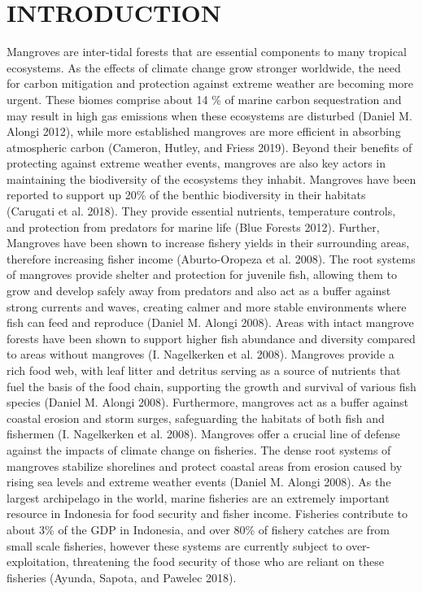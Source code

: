 \documentclass[
]{article}
\begin{document}
\section{INTRODUCTION}\label{introduction}

Mangroves are inter-tidal forests that are essential components to many tropical ecosystems. As the effects of climate change grow stronger worldwide, the need for carbon mitigation and protection against extreme weather are becoming more urgent. These biomes comprise about 14 \% of marine carbon sequestration and may result in high gas emissions when these ecosystems are disturbed (Daniel M. Alongi 2012), while more established mangroves are more efficient in absorbing atmospheric carbon (Cameron, Hutley, and Friess 2019). Beyond their benefits of protecting against extreme weather events, mangroves are also key actors in maintaining the biodiversity of the ecosystems they inhabit. Mangroves have been reported to support up 20\% of the benthic biodiversity in their habitats (Carugati et al. 2018). They provide essential nutrients, temperature controls, and protection from predators for marine life (Blue Forests 2012). Further, Mangroves have been shown to increase fishery yields in their surrounding areas, therefore increasing fisher income (Aburto-Oropeza et al. 2008). The root systems of mangroves provide shelter and protection for juvenile fish, allowing them to grow and develop safely away from predators and also act as a buffer against strong currents and waves, creating calmer and more stable environments where fish can feed and reproduce (Daniel M. Alongi 2008). Areas with intact mangrove forests have been shown to support higher fish abundance and diversity compared to areas without mangroves (I. Nagelkerken et al. 2008). Mangroves provide a rich food web, with leaf litter and detritus serving as a source of nutrients that fuel the basis of the food chain, supporting the growth and survival of various fish species (Daniel M. Alongi 2008). Furthermore, mangroves act as a buffer against coastal erosion and storm surges, safeguarding the habitats of both fish and fishermen (I. Nagelkerken et al. 2008). Mangroves offer a crucial line of defense against the impacts of climate change on fisheries. The dense root systems of mangroves stabilize shorelines and protect coastal areas from erosion caused by rising sea levels and extreme weather events (Daniel M. Alongi 2008). As the largest archipelago in the world, marine fisheries are an extremely important resource in Indonesia for food security and fisher income. Fisheries contribute to about 3\% of the GDP in Indonesia, and over 80\% of fishery catches are from small scale fisheries, however these systems are currently subject to over-exploitation, threatening the food security of those who are reliant on these fisheries (Ayunda, Sapota, and Pawelec 2018).
\end{document}
